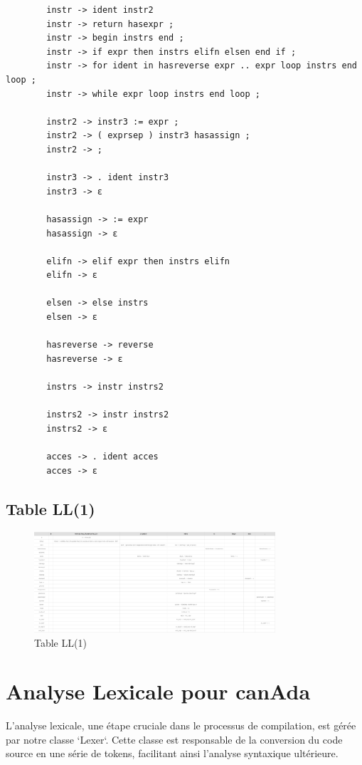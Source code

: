 \documentclass[french,a4paper]{article}
\begin{document}
\begin{verbatim}
        instr -> ident instr2
        instr -> return hasexpr ;
        instr -> begin instrs end ;
        instr -> if expr then instrs elifn elsen end if ;
        instr -> for ident in hasreverse expr .. expr loop instrs end loop ;
        instr -> while expr loop instrs end loop ;

        instr2 -> instr3 := expr ;
        instr2 -> ( exprsep ) instr3 hasassign ;
        instr2 -> ;

        instr3 -> . ident instr3
        instr3 -> ε

        hasassign -> := expr
        hasassign -> ε

        elifn -> elif expr then instrs elifn
        elifn -> ε

        elsen -> else instrs
        elsen -> ε

        hasreverse -> reverse
        hasreverse -> ε

        instrs -> instr instrs2

        instrs2 -> instr instrs2
        instrs2 -> ε

        acces -> . ident acces
        acces -> ε
    \end{verbatim}

    \subsection{Table LL(1)}\label{subsec:table-ll(1)}

    \begin{figure}[H]
        \centering
        \includegraphics[width=0.8\textwidth]{partial_table}
        \caption{Table LL(1)}\label{fig:figure2}
    \end{figure}

    \section{Analyse Lexicale pour canAda}\label{sec:analyse-lexicale-pour-canada}

    L'analyse lexicale, une étape cruciale dans le processus de compilation, est gérée par notre classe `Lexer`. Cette classe est responsable de la conversion du code source en une série de tokens, facilitant ainsi l'analyse syntaxique ultérieure.
\end{document}
